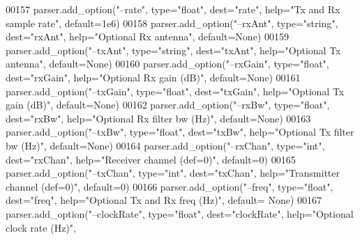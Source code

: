 \begin{DoxyCode}
{{{{{{{00157     parser.add\_option(\textcolor{stringliteral}{"--rate"}, type=\textcolor{stringliteral}{"float"}, dest=\textcolor{stringliteral}{"rate"}, help=\textcolor{stringliteral}{"Tx and Rx sample rate"}, default=1e6)
00158     parser.add\_option(\textcolor{stringliteral}{"--rxAnt"}, type=\textcolor{stringliteral}{"string"}, dest=\textcolor{stringliteral}{"rxAnt"}, help=\textcolor{stringliteral}{"Optional Rx antenna"}, default=\textcolor{keywordtype}{None})
00159     parser.add\_option(\textcolor{stringliteral}{"--txAnt"}, type=\textcolor{stringliteral}{"string"}, dest=\textcolor{stringliteral}{"txAnt"}, help=\textcolor{stringliteral}{"Optional Tx antenna"}, default=\textcolor{keywordtype}{None})
00160     parser.add\_option(\textcolor{stringliteral}{"--rxGain"}, type=\textcolor{stringliteral}{"float"}, dest=\textcolor{stringliteral}{"rxGain"}, help=\textcolor{stringliteral}{"Optional Rx gain (dB)"}, default=\textcolor{keywordtype}{None})
00161     parser.add\_option(\textcolor{stringliteral}{"--txGain"}, type=\textcolor{stringliteral}{"float"}, dest=\textcolor{stringliteral}{"txGain"}, help=\textcolor{stringliteral}{"Optional Tx gain (dB)"}, default=\textcolor{keywordtype}{None})
00162     parser.add\_option(\textcolor{stringliteral}{"--rxBw"}, type=\textcolor{stringliteral}{"float"}, dest=\textcolor{stringliteral}{"rxBw"}, help=\textcolor{stringliteral}{"Optional Rx filter bw (Hz)"}, default=\textcolor{keywordtype}{None})
00163     parser.add\_option(\textcolor{stringliteral}{"--txBw"}, type=\textcolor{stringliteral}{"float"}, dest=\textcolor{stringliteral}{"txBw"}, help=\textcolor{stringliteral}{"Optional Tx filter bw (Hz)"}, default=\textcolor{keywordtype}{None})
00164     parser.add\_option(\textcolor{stringliteral}{"--rxChan"}, type=\textcolor{stringliteral}{"int"}, dest=\textcolor{stringliteral}{"rxChan"}, help=\textcolor{stringliteral}{"Receiver channel (def=0)"}, default=0)
00165     parser.add\_option(\textcolor{stringliteral}{"--txChan"}, type=\textcolor{stringliteral}{"int"}, dest=\textcolor{stringliteral}{"txChan"}, help=\textcolor{stringliteral}{"Transmitter channel (def=0)"}, default=0)
00166     parser.add\_option(\textcolor{stringliteral}{"--freq"}, type=\textcolor{stringliteral}{"float"}, dest=\textcolor{stringliteral}{"freq"}, help=\textcolor{stringliteral}{"Optional Tx and Rx freq (Hz)"}, default=\textcolor{keywordtype}{
      None})
00167     parser.add\_option(\textcolor{stringliteral}{"--clockRate"}, type=\textcolor{stringliteral}{"float"}, dest=\textcolor{stringliteral}{"clockRate"}, help=\textcolor{stringliteral}{"Optional clock rate (Hz)"}, 
}}}}}}}
\end{DoxyCode}
